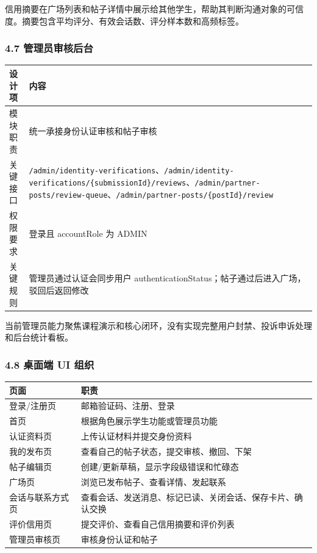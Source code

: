 \documentclass[
]{ctexart}
\begin{document}
信用摘要在广场列表和帖子详情中展示给其他学生，帮助其判断沟通对象的可信度。摘要包含平均评分、有效会话数、评分样本数和高频标签。

\hypertarget{ux7ba1ux7406ux5458ux5ba1ux6838ux540eux53f0}{%
\subsubsection{4.7
管理员审核后台}\label{ux7ba1ux7406ux5458ux5ba1ux6838ux540eux53f0}}

\begin{longtable}[]{@{}
  >{\raggedright\arraybackslash}p{}
  >{\raggedright\arraybackslash}p{}@{}}
\toprule
设计项 & 内容 \\
\midrule
\endhead
模块职责 & 统一承接身份认证审核和帖子审核 \\
关键接口 &
\texttt{/admin/identity-verifications}、\texttt{/admin/identity-verifications/\{submissionId\}/reviews}、\texttt{/admin/partner-posts/review-queue}、\texttt{/admin/partner-posts/\{postId\}/review} \\
权限要求 & 登录且 accountRole 为 ADMIN \\
关键规则 & 管理员通过认证会同步用户
authenticationStatus；帖子通过后进入广场，驳回后返回修改 \\
\bottomrule
\end{longtable}

当前管理员能力聚焦课程演示和核心闭环，没有实现完整用户封禁、投诉申诉处理和后台统计看板。

\hypertarget{ux684cux9762ux7aef-ui-ux7ec4ux7ec7}{%
\subsubsection{4.8 桌面端 UI
组织}\label{ux684cux9762ux7aef-ui-ux7ec4ux7ec7}}

\begin{longtable}[]{@{}ll@{}}
\toprule
页面 & 职责 \\
\midrule
\endhead
登录/注册页 & 邮箱验证码、注册、登录 \\
首页 & 根据角色展示学生功能或管理员功能 \\
认证资料页 & 上传认证材料并提交身份资料 \\
我的发布页 & 查看自己的帖子状态，提交审核、撤回、下架 \\
帖子编辑页 & 创建/更新草稿，显示字段级错误和忙碌态 \\
广场页 & 浏览已发布帖子、查看详情、发起联系 \\
会话与联系方式页 &
查看会话、发送消息、标记已读、关闭会话、保存卡片、确认交换 \\
评价信用页 & 提交评价、查看自己信用摘要和评价列表 \\
管理员审核页 & 审核身份认证和帖子 \\
\bottomrule
\end{longtable}
\end{document}

